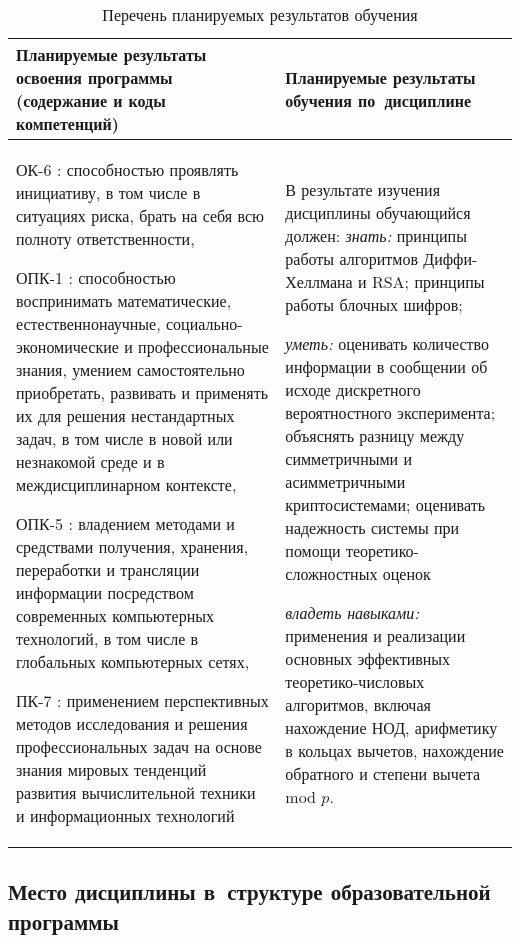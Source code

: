 \documentclass[a4paper,12pt]{article}
\begin{document}
\begin{longtable}{|p{95mm}|p{55mm}|}
  \caption{Перечень планируемых результатов обучения}\\
  \hline
  \centering
  Планируемые результаты освоения программы (содержание и коды компетенций) & 
  \centering\arraybackslash
  Планируемые результаты обучения по~дисциплине
  \\
  \hline
  
  ОК-6 : способностью проявлять инициативу, в том числе в ситуациях риска, брать на себя всю полноту ответственности, \par 
  
  ОПК-1 : способностью воспринимать математические, естественнонаучные, социально-экономические и профессиональные знания, умением самостоятельно приобретать, развивать и применять их для решения нестандартных задач, в том числе в новой или незнакомой среде и в междисциплинарном контексте, \par 
  
  ОПК-5 : владением методами и средствами получения, хранения, переработки и трансляции информации посредством современных компьютерных технологий, в том числе в глобальных компьютерных сетях, \par 
  
  ПК-7 : применением перспективных методов исследования и решения профессиональных задач на основе знания мировых тенденций развития вычислительной техники и информационных технологий
  & 
  В результате изучения дисциплины обучающийся должен:\newline
  \emph{знать:}
  принципы работы алгоритмов Диффи-Хеллмана и RSA; принципы работы блочных шифров;
  

  \emph{уметь:}
  оценивать количество информации в сообщении об исходе дискретного вероятностного эксперимента; объяснять разницу между симметричными и асимметричными криптосистемами; оценивать надежность системы при помощи теоретико-сложностных оценок
  

  \emph{владеть навыками:}
  применения и реализации основных эффективных теоретико-числовых алгоритмов, включая нахождение НОД, арифметику в кольцах вычетов, нахождение обратного и степени вычета mod $p$.
  
  \\
  \hline
  \end{longtable}


\subsection{Место дисциплины в~структуре образовательной программы}
\end{document}
